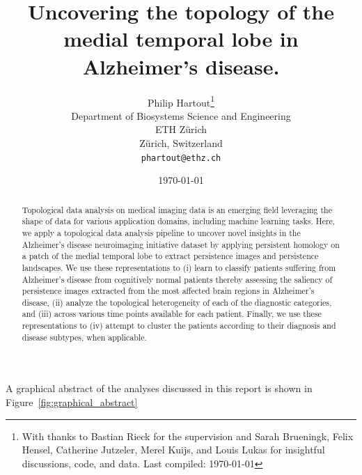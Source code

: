 \documentclass{article}
\title{Uncovering the topology of the medial temporal lobe in Alzheimer's disease.}
\author{Philip Hartout\thanks{With thanks to Bastian Rieck for the supervision and Sarah
  Brueningk, Felix Hensel, Catherine Jutzeler, Merel Kuijs, and Louis Lukas for insightful discussions, code, and data. Last compiled: \today}\\ Department of Biosystems Science and Engineering\\ ETH Zürich\\ Zürich, Switzerland \\ \texttt{phartout@ethz.ch} \\ } \date{\today}
\begin{document}
\maketitle

\begin{abstract}
Topological data analysis on medical imaging data is an emerging field
leveraging the shape of data for various application domains, including machine
learning tasks. Here, we apply a topological data analysis pipeline to uncover
novel insights in the Alzheimer's disease neuroimaging initiative dataset by
applying persistent homology on a patch of the medial temporal lobe to extract
persistence images and persistence landscapes. We use these representations to
(i) learn to classify patients suffering from Alzheimer's disease from
cognitively normal patients thereby assessing the saliency of persistence images
extracted from the most affected brain regions in Alzheimer's disease, (ii)
analyze the topological heterogeneity of each of the diagnostic categories, and
(iii) across various time points available for each patient. Finally, we use
these representations to (iv) attempt to cluster the patients according to their
diagnosis and disease subtypes, when applicable.
\end{abstract}

A graphical abstract of the analyses discussed in this report is shown in
Figure~\ref{fig:graphical_abstract}
\end{document}
